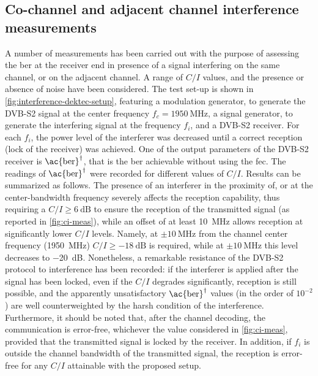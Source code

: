 \documentclass[conference,10pt,a4paper]{IEEEtran}%
\begin{document}
\subsection{Co-channel and adjacent channel interference measurements}
A number of measurements has been carried out with the purpose of assessing the \ac{ber} at the receiver end in presence of a signal interfering on the same channel, or on the adjacent channel.
A range of $C/I$ values, and the presence or absence of noise have been considered.
The test set-up is shown in \cref{fig:interference-dektec-setup}, featuring a modulation generator, to generate the DVB-S2 signal at the center frequency $f_c = \SI{1950}{\MHz}$, a signal generator, to generate the interfering signal at the frequency $f_i$, and a DVB-S2 receiver.
For each $f_i$, the power level of the interferer was decreased until a correct reception (lock of the receiver) was achieved.
One of the output parameters of the DVB-S2 receiver is $\text{\ac{ber}}^\dagger$, that is the \ac{ber} achievable without using the \ac{fec}.
The readings of $\text{\ac{ber}}^\dagger$ were recorded for different values of $C/I$.
Results can be summarized as follows.
The presence of an interferer in the proximity of, or at the center-bandwidth frequency severely affects the reception capability, thus requiring a $C/I \geqslant \SI{6}{\deci\bel}$ to ensure the reception of the transmitted signal (as reported in \cref{fig:ci-meas}), while an offset of at least \SI{10}{\mega\Hz} allows reception at significantly lower $C/I$ levels.
Namely, at $\pm\SI{10}{\MHz}$ from the channel center frequency (\SI{1950}{\MHz}) $C/I \geqslant \SI{-18}{\dB}$ is required, while at $\pm\SI{10}{\MHz}$ this level decreases to \SI{-20}{\dB}.
Nonetheless, a remarkable resistance of the DVB-S2 protocol to interference has been recorded: if the interferer is applied after the signal has been locked, even if the $C/I$ degrades significantly, reception is still possible, and the apparently unsatisfactory $\text{\ac{ber}}^\dagger$ values (in the order of $10^{-2}$) are well counterweighted by the harsh condition of the interference.
Furthermore, it should be noted that, after the channel decoding, the communication is error-free, whichever the value considered in \cref{fig:ci-meas}, provided that the transmitted signal is locked by the receiver.
In addition, if $f_i$ is outside the channel bandwidth of the transmitted signal, the reception is error-free for any $C/I$ attainable with the proposed setup.
\end{document}
